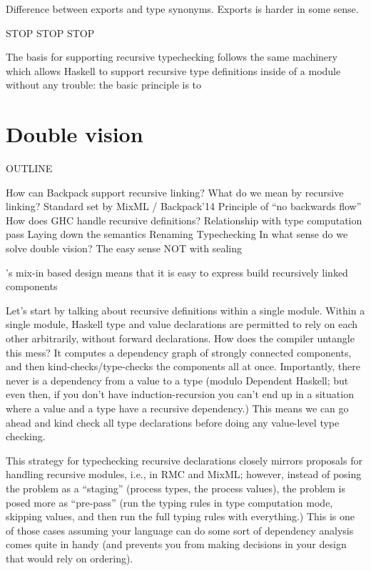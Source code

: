 Difference between exports and type synonyms. Exports is harder
in some sense.



STOP STOP STOP

The basis for supporting recursive typechecking follows the same
machinery which allows Haskell to support recursive type definitions
inside of a module without any trouble: the basic principle is to

\section{Double vision}


OUTLINE

How can Backpack support recursive linking?
What do we mean by recursive linking?
    Standard set by MixML / Backpack'14
    Principle of ``no backwards flow''
How does GHC handle recursive definitions?
    Relationship with type computation pass
Laying down the semantics
    Renaming
    Typechecking
In what sense do we solve double vision?
    The easy sense
    NOT with sealing



\Backpack{}'s mix-in based design means that it is easy to express
build recursively linked components





Let's start by talking about recursive definitions within a single
module.  Within a single module, Haskell type and value declarations
are permitted to rely on each other arbitrarily, without forward
declarations.  How does the compiler untangle this mess?  It computes
a dependency graph of strongly connected components, and then kind-checks/type-checks
the components all at once.  Importantly, there never is a dependency
from a value to a type (modulo Dependent Haskell; but even then, if
you don't have induction-recursion you can't end up in a situation where
a value and a type have a recursive dependency.)  This means we can go ahead
and kind check all type declarations before doing any value-level type
checking.

This strategy for typechecking recursive declarations closely mirrors
proposals for handling recursive modules, i.e., in RMC and MixML\@; however,
instead of posing the problem as a ``staging'' (process types, the process
values), the problem is posed more as ``pre-pass'' (run the typing rules in
type computation mode, skipping values, and then run the full typing
rules with everything.)  This is one of those cases assuming your language
can do some sort of dependency analysis comes quite in handy (and prevents
you from making decisions in your design that would rely on ordering).

